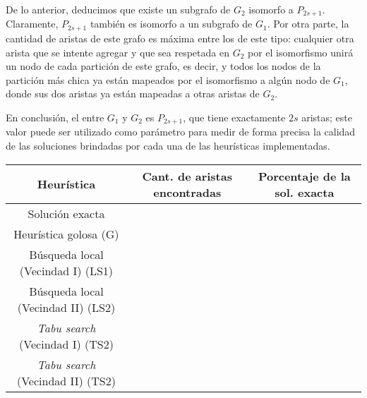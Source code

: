 De lo anterior, deducimos que existe un subgrafo de $G_2$ isomorfo a
$P_{2s+1}$. Claramente, $P_{2s+1}$ también es isomorfo a un subgrafo de $G_1$.
Por otra parte, la cantidad de aristas de este grafo es máxima entre los de
este tipo: cualquier otra arista que se intente agregar y que sea respetada en
$G_2$ por el isomorfismo unirá un nodo de cada partición de este grafo, es
decir, y todos los nodos de la partición más chica ya están mapeados por el
isomorfismo a algún nodo de $G_1$, donde sus dos aristas ya están mapeadas a
otras aristas de $G_2$.

En conclusión, el  entre $G_1$ y $G_2$ es $P_{2s+1}$, que tiene
exactamente $2s$ aristas; este valor puede ser utilizado como parámetro para
medir de forma precisa la calidad de las soluciones brindadas por cada
una de las heurísticas implementadas.

\begin{center}

\begin{tabular}{c|c|c}
Heurística                             & Cant. de aristas encontradas & Porcentaje de la sol. exacta \\ \hline
Solución exacta                        &                              &                              \\
Heurística golosa (G)                  &                              &                              \\
Búsqueda local (Vecindad I) (LS1)      &                              &                              \\
Búsqueda local (Vecindad II) (LS2)     &                              &                              \\
\emph{Tabu search} (Vecindad I) (TS2)  &                              &                              \\
\emph{Tabu search} (Vecindad II) (TS2) &                              &                              \\
\end{tabular}

\end{center}

